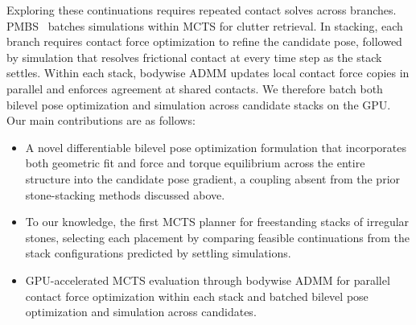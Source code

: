 Exploring these continuations requires repeated contact solves across branches. PMBS~\cite{huang2022pmbs} batches simulations within MCTS for clutter retrieval. In stacking, each branch requires contact force optimization to refine the candidate pose, followed by simulation that resolves frictional contact at every time step as the stack settles.
Within each stack, bodywise ADMM updates local contact force copies in parallel and enforces agreement at shared contacts.
We therefore batch both bilevel pose optimization and simulation across candidate stacks on the GPU.
Our main contributions are as follows:
\begin{itemize}[\setlength{\topsep}{2pt}\setlength{\parskip}{0pt}]
\item A novel differentiable bilevel pose optimization formulation that incorporates both geometric fit and force and torque equilibrium across the entire structure into the candidate pose gradient, a coupling absent from the prior stone-stacking methods discussed above.
\item To our knowledge, the first MCTS planner for freestanding stacks of irregular stones, selecting each placement by comparing feasible continuations from the stack configurations predicted by settling simulations.
\item GPU-accelerated MCTS evaluation through bodywise ADMM for parallel contact force optimization within each stack and batched bilevel pose optimization and simulation across candidates.
\end{itemize}
